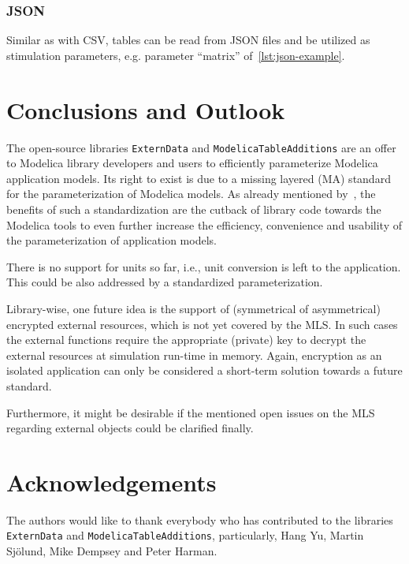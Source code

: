 \documentclass{modelica}
\newcommand{\modelica}[1]{\lstinline[language=modelica]|#1|}
\begin{document}
\subsubsection{JSON}

Similar as with CSV, tables can be read from JSON files and be utilized as stimulation parameters, e.g. parameter ``matrix'' of~\autoref{lst:json-example}.

\section{Conclusions and Outlook}

The open-source libraries \modelica{ExternData} and \modelica{ModelicaTableAdditions} are an offer to Modelica library developers and users to efficiently parameterize Modelica application models.
Its right to exist is due to a missing layered (MA) standard for the parameterization of Modelica models.
As already mentioned by~\textcite{modelica2005Ford}, the benefits of such a standardization are the cutback of library code towards the Modelica tools to even further increase the efficiency, convenience and usability of the parameterization of application models.

There is no support for units so far, i.e., unit conversion is left to the application.
This could be also addressed by a standardized parameterization.

Library-wise, one future idea is the support of (symmetrical of asymmetrical) encrypted external resources, which is not yet covered by the MLS.
In such cases the external functions require the appropriate (private) key to decrypt the external resources at simulation run-time in memory.
Again, encryption as an isolated application can only be considered a short-term solution towards a future standard.

Furthermore, it might be desirable if the mentioned open issues on the MLS regarding external objects could be clarified finally.

\section*{Acknowledgements}

The authors would like to thank everybody who has contributed to the libraries \modelica{ExternData} and \modelica{ModelicaTableAdditions}, particularly, Hang Yu, Martin Sjölund, Mike Dempsey and Peter Harman.

\printbibliography
\end{document}
